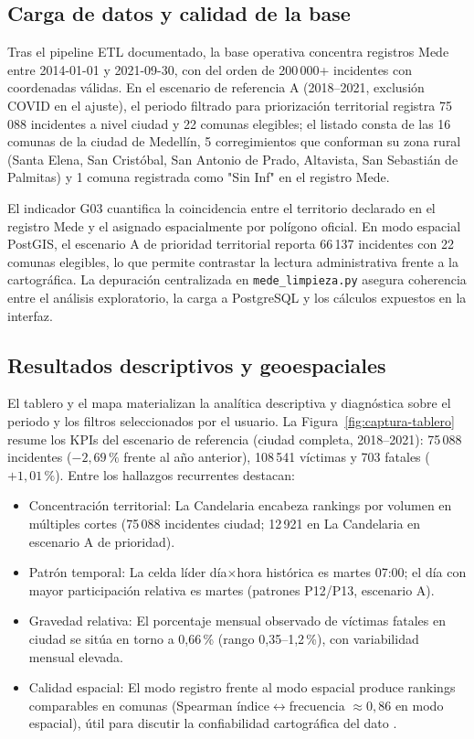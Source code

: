 \subsection{Carga de datos y calidad de la base}

Tras el pipeline ETL documentado, la base operativa concentra registros Mede entre 2014-01-01 y 2021-09-30, con del orden de 200\,000+ incidentes con coordenadas válidas. En el escenario de referencia A (2018--2021, exclusión COVID en el ajuste), el periodo filtrado para priorización territorial registra 75\,088 incidentes a nivel ciudad y 22 comunas elegibles; el listado consta de las 16 comunas de la ciudad de Medellín, 5 corregimientos que conforman su zona rural (Santa Elena, San Cristóbal, San Antonio de Prado, Altavista, San Sebastián de Palmitas) y 1 comuna registrada como "Sin Inf" en el registro Mede.

El indicador G03 cuantifica la coincidencia entre el territorio declarado en el registro Mede y el asignado espacialmente por polígono oficial. En modo espacial PostGIS, el escenario A de prioridad territorial reporta 66\,137 incidentes con 22 comunas elegibles, lo que permite contrastar la lectura administrativa frente a la cartográfica. La depuración centralizada en \texttt{mede\_limpieza.py} asegura coherencia entre el análisis exploratorio, la carga a PostgreSQL y los cálculos expuestos en la interfaz.

\subsection{Resultados descriptivos y geoespaciales}

El tablero y el mapa materializan la analítica descriptiva y diagnóstica sobre el periodo y los filtros seleccionados por el usuario. La Figura~\ref{fig:captura-tablero} resume los KPIs del escenario de referencia (ciudad completa, 2018--2021): 75\,088 incidentes ($-2{,}69\,\%$ frente al año anterior), 108\,541 víctimas y 703 fatales ($+1{,}01\,\%$). Entre los hallazgos recurrentes destacan:

\begin{itemize}
	\item Concentración territorial: La Candelaria encabeza rankings por volumen en múltiples cortes (75\,088 incidentes ciudad; 12\,921 en La Candelaria en escenario A de prioridad).
	\item Patrón temporal: La celda líder día$\times$hora histórica es martes 07:00; el día con mayor participación relativa es martes (patrones P12/P13, escenario A).
	\item Gravedad relativa: El porcentaje mensual observado de víctimas fatales en ciudad se sitúa en torno a 0,66\,\% (rango 0,35--1,2\,\%), con variabilidad mensual elevada.
	\item Calidad espacial: El modo registro frente al modo espacial produce rankings comparables en comunas (Spearman índice$\leftrightarrow$frecuencia $\approx 0{,}86$ en modo espacial), útil para discutir la confiabilidad cartográfica del dato \cite{monar2025}.
\end{itemize}

